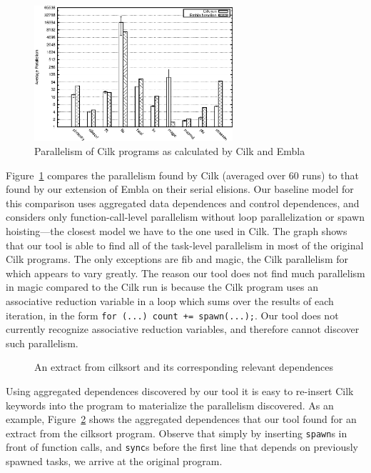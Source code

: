\begin{figure}
 \centering
 \includegraphics[width=2.9in]{cilk-run}
 \caption{Parallelism of Cilk programs as calculated by Cilk and Embla}
 \label{cilk-run}
\end{figure}

Figure~\ref{cilk-run} compares the parallelism found by Cilk (averaged over 60 runs) to that found by our extension of Embla on their serial elisions.
Our baseline model for this comparison uses aggregated data dependences and control dependences, and considers only function-call-level parallelism without loop parallelization or spawn hoisting---the closest model we have to the one used in Cilk.
The graph shows that our tool is able to find all of the task-level parallelism in most of the original Cilk programs.
The only exceptions are \textsf{fib} and \textsf{magic}, the Cilk parallelism for which appears to vary greatly.
The reason our tool does not find much parallelism in \textsf{magic} compared to the Cilk run is because the Cilk program uses an associative reduction variable in a loop which sums over the results of each iteration, in the form \texttt{for (...) count += spawn(...);}.
Our tool does not currently recognize associative reduction variables, and therefore cannot discover such parallelism.

\begin{figure}[t]
  \begin{center}
  \scriptsize
  
  \end{center}
  \caption{An extract from \textsf{cilksort} and its corresponding relevant dependences}
  \label{cilksort-depgraph}
\end{figure}

Using aggregated dependences discovered by our tool it is easy to re-insert Cilk keywords into the program to materialize the parallelism discovered.
As an example, Figure~\ref{cilksort-depgraph} shows the aggregated dependences that our tool found for an extract from the \textsf{cilksort} program.
Observe that simply by inserting \texttt{spawn}s in front of function calls, and \texttt{sync}s before the first line that depends on previously spawned tasks, we arrive at the original program.

